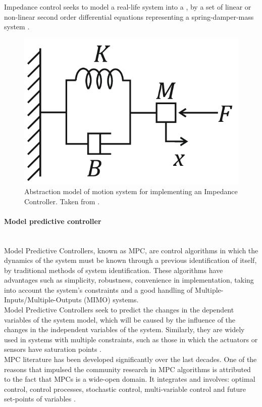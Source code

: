 \documentclass[11pt]{report} %
\newcommand{\subsubsubsection}[1]{\paragraph{#1}\mbox{}\\}
\begin{document}
Impedance control seeks to model a real-life system into a , by a set of linear or non-linear second order differential equations representing a spring-damper-mass system \citep{cite_canudas_theory_of_robotic_control}.\\

\begin{figure}[H]
    \centering
    \includegraphics[width=0.4\linewidth]{assets/imgs/reference_framework/mass_damper_mass_system_for_impedance_control.png}
    \caption{Abstraction model of motion system for implementing an Impedance Controller. Taken from \citep{cite_mass_spring_damper_system_ic}.} 
    \label{fig_mass_spring_damper_system}
\end{figure}


\subsubsubsection{Model predictive controller}

Model Predictive Controllers, known as MPC, are control algorithms in which the dynamics of the system must be known through a previous identification of itself, by traditional methods of system identification. These algorithms have advantages such as simplicity, robustness, convenience in implementation, taking into account the system's constraints and a good handling of Multiple-Inputs/Multiple-Outputs (MIMO) systems.\\

Model Predictive Controllers seek to predict the changes in the dependent variables of the system model, which will be caused by the influence of the changes in the independent variables of the system. Similarly, they are widely used in systems with multiple constraints, such as those in which the actuators or sensors have saturation points \citep{cite_mpc_industrial_processes_automation_systems}.\\

MPC literature has been developed significantly over the last decades. One of the reasons that impulsed the community research in MPC algorithms is attributed to the fact that MPCs is a wide-open domain. It integrates and involves: optimal control, control processes, stochastic control, multi-variable control and future set-points of variables \citep{cite_model_predictive_control_camacho_bordons}.\\ 
\end{document}
